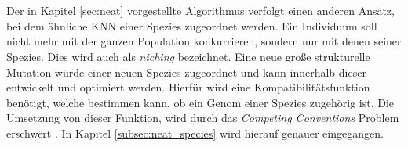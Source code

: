 \\\\
Der in Kapitel \ref{sec:neat} vorgestellte Algorithmus verfolgt einen anderen Ansatz, bei dem ähnliche \ac{KNN} einer Spezies zugeordnet werden. Ein Individuum soll nicht mehr mit der ganzen Population konkurrieren, sondern nur mit denen seiner Spezies. Dies wird auch als \emph{niching} bezeichnet. Eine neue große strukturelle Mutation würde einer neuen Spezies zugeordnet und kann innerhalb dieser entwickelt und optimiert werden. Hierfür wird eine Kompatibilitätsfunktion benötigt, welche bestimmen kann, ob ein Genom einer Spezies zugehörig ist. Die Umsetzung von dieser Funktion, wird durch das \emph{Competing Conventions} Problem erschwert \cite{stanley2002evolving}. In Kapitel \ref{subsec:neat_species} wird hierauf genauer eingegangen.
 

